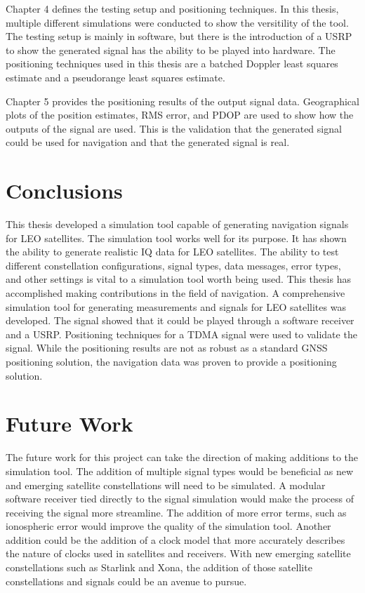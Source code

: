 \documentclass[12pt]{report}
\begin{document}
Chapter 4 defines the testing setup and positioning techniques. In this thesis, multiple different simulations were conducted to show the versitility of the tool. The testing setup is mainly in software, but there is the introduction of a USRP to show the generated signal has the ability to be played into hardware. The positioning techniques used in this thesis are a batched Doppler least squares estimate and a pseudorange least squares estimate. 

Chapter 5 provides the positioning results of the output signal data. Geographical plots of the position estimates, RMS error, and PDOP are used to show how the outputs of the signal are used. This is the validation that the generated signal could be used for navigation and that the generated signal is real. 

\section{Conclusions}
This thesis developed a simulation tool capable of generating navigation signals for LEO satellites. The simulation tool works well for its purpose. It has shown the ability to generate realistic IQ data for LEO satellites. The ability to test different constellation configurations, signal types, data messages, error types, and other settings is vital to a simulation tool worth being used. This thesis has accomplished making contributions in the field of navigation. A comprehensive simulation tool for generating measurements and signals for LEO satellites was developed. The signal showed that it could be played through a software receiver and a USRP. Positioning techniques for a TDMA signal were used to validate the signal. While the positioning results are not as robust as a standard GNSS positioning solution, the navigation data was proven to provide a positioning solution. 


\section{Future Work}
The future work for this project can take the direction of making additions to the simulation tool. The addition of multiple signal types would be beneficial as new and emerging satellite constellations will need to be simulated. A modular software receiver tied directly to the signal simulation would make the process of receiving the signal more streamline. The addition of more error terms, such as ionospheric error would improve the quality of the simulation tool. Another addition could be the addition of a clock model that more accurately describes the nature of clocks used in satellites and receivers. With new emerging satellite constellations such as Starlink and Xona, the addition of those satellite constellations and signals could be an avenue to pursue. 
\end{document}
